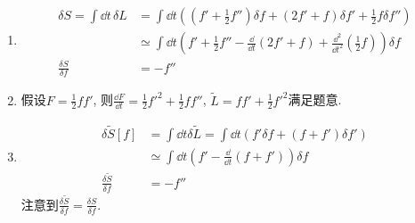 \begin{solution}
    \begin{enumerate}[label=(\arabic*)]
        \item     \[
            \begin{aligned}
                \delta S = \int \dd t\,\delta L &= \int \dd t \left(\left(f' + \frac{1}{2}f''\right)\delta f + \left(2f' + f\right)\delta f' + \frac{1}{2}f \delta f''\right)\\
                &\simeq \int \dd t \left(f' + \frac{1}{2}f'' - \frac{\dd}{\dd t}\left(2f'+f\right)+\frac{\dd^2}{\dd t^2}\left(\frac{1}{2}f\right)\right) \delta f \\
                \frac{\delta S}{\delta f} &= - f''
            \end{aligned}
            \]
        \item 假设\(F = \frac{1}{2}f f'\), 则\(\frac{\dd F}{\dd t} = \frac{1}{2}f'^2 + \frac{1}{2} f f''\), \(\tilde{L} = f f' + \frac{1}{2}f'^2\)满足题意.
        \item \[
        \begin{aligned}
            \delta \tilde{S}[f] &= \int \dd t \delta \tilde{L} = \int \dd t \left(f' \delta f + (f + f') \delta f'\right) \\
            &\simeq \int \dd t \left(f' - \frac{\dd}{\dd t} (f + f')\right)\delta f \\
            \frac{\delta \tilde{S}}{\delta f} &= - f''
        \end{aligned}
        \]
        注意到\(\frac{\delta \tilde{S}}{\delta f} = \frac{\delta S}{\delta f}\). 
    \end{enumerate}
\end{solution}

